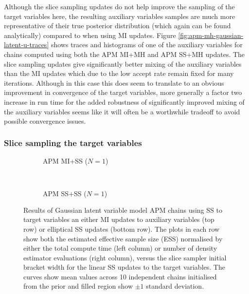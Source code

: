 Although the slice sampling updates do not help improve the sampling of the target variables here, the resulting auxiliary variables samples are much more representative of their true posterior distribution (which again can be found analytically) compared to when using \ac{MI} updates. Figure \ref{fig:apm-mh-gaussian-latent-u-traces} shows traces and histograms of one of the auxiliary variables for chains computed using both the \ac{APM} \ac{MI}+\ac{MH} and \ac{APM} \ac{SS}+\ac{MH} updates. The slice sampling updates give significantly better mixing of the auxiliary variables than the \ac{MI} updates which due to the low accept rate remain fixed for many iterations. Although in this case this does seem to translate to an obvious improvement in convergence of the target variables, more generally a factor two increase in run time for the added robustness of significantly improved mixing of the auxiliary variables seems like it will often be a worthwhile tradeoff to avoid possible convergence issues.

\subsubsection{Slice sampling the target variables}

\begin{figure}
\centering
\begin{subfigure}[b]{\linewidth}
\centering
  \caption{\ac{APM} \ac{MI}+\ac{SS} ($N=1$)}
  \label{sfig:apm-mi-ss-1-gaussian-latent}
\end{subfigure}
\\[3mm]
\begin{subfigure}[b]{\linewidth}
\centering
  \caption{\ac{APM} \ac{SS}+\ac{SS} ($N=1$)}
  \label{sfig:apm-ss-ss-1-gaussian-latent}
\end{subfigure}
\caption[\acs{APM} \acs{SS} Gaussian model results.]{
Results of Gaussian latent variable model \acs{APM} chains using \ac{SS} to target variables an either \ac{MI} updates to auxiliary variables (top row) or elliptical \ac{SS} updates (bottom row). The plots in each row show both the estimated effective sample size (ESS) normalised by either the total compute time (left column) or number of density estimator evaluations (right column), versus the slice sampler initial bracket width for the linear \ac{SS} updates to the target variables. The curves show mean values across 10 independent chains initialised from the prior and filled region show $\pm 1$ standard deviation.}
\label{fig:apm-ss-gaussian-latent-results}
\end{figure}

